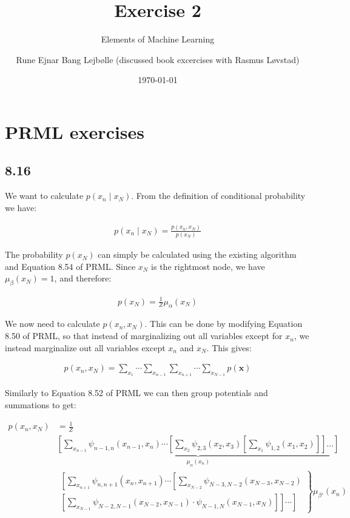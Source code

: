\documentclass[a4paper, 12pt]{article}
\author{Rune Ejnar Bang Lejbølle (discussed book excercises with Rasmus Løvstad)}
\title{Exercise 2}
\subtitle{Elements of Machine Learning}
\date{\today}
\begin{document}
	
\maketitle


\section{PRML exercises}

\subsection{8.16}

We want to calculate $p(x_n \mid x_N)$. From the definition of conditional probability we have:

\begin{align}
	p(x_n \mid x_N) = \frac{p(x_n, x_N)}{p(x_N)}
\end{align}

The probability $p(x_N)$ can simply be calculated using the existing algorithm and Equation 8.54 of PRML. Since $x_N$ is the rightmost node, we have $\mu_{\beta}(x_N) = 1$, and therefore:

\begin{align}
	p(x_N) = \frac{1}{Z} \mu_{\alpha}(x_N)
\end{align}

We now need to calculate $p(x_n, x_N)$. This can be done by modifying Equation 8.50 of PRML, so that instead of marginalizing out all variables except for $x_n$, we instead marginalize out all variables except $x_n$ and $x_N$. This gives:

\begin{align}
	p(x_n, x_N) = \sum_{x_1} \cdots \sum_{x_{n-1}} \sum_{x_{n+1}} \cdots \sum_{x_{N-1}} p(\mathbf{x})
\end{align}

Similarly to Equation 8.52 of PRML we can then group potentials and summations to get:

\begin{align}
	p\left(x_{n}, x_{N}\right) &=\frac{1}{Z} \\
	&\underbrace{\left[\sum_{x_{n-1}} \psi_{n-1, n}\left(x_{n-1}, x_{n}\right) \cdots\left[\sum_{x_{2}} \psi_{2,3}\left(x_{2}, x_{3}\right)\left[\sum_{x_{1}} \psi_{1,2}\left(x_{1}, x_{2}\right)\right]\right] \ldots\right]}_{\mu_{\alpha}\left(x_{n}\right)} \\
	&\left.
	\begin{array}{l}
		\left[\sum_{x_{n+1}} \psi_{n, n+1}\left(x_{n}, x_{n+1}\right) \cdots  \left[\sum_{x_{N-2}} \psi_{N-3, N-2}\left(x_{N-3}, x_{N-2}\right)\right.\right.\\
		\left.\left.\left[\sum_{x_{N-1}} \psi_{N-2, N-1}\left(x_{N-2}, x_{N-1}\right) \cdot \psi_{N-1, N}\left(x_{N-1}, x_{N}\right)\right]\right] \cdots\right]
	\end{array}
	\right\} \mu_{\beta'}\left(x_{n}\right) 
\end{align}
\end{document}
